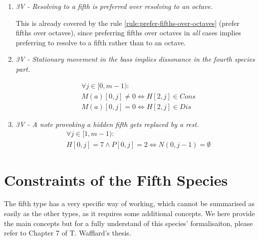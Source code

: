 \begin{enumerate}[wide, label=\bfseries 4.P\arabic*]
    \item \textit{3V - Resolving to a fifth is preferred over resolving to an octave.}    
    
    This is already covered by the rule \ref{rule:prefer-fifths-over-octaves} (prefer fifths over octaves), since preferring fifths over octaves in \textit{all} cases implies preferring to resolve to a fifth rather than to an octave.

    \item \textit{3V - Stationary movement in the bass implies dissonance in the fourth species part.}

    \begin{equation}
        \begin{aligned}
        &\forall j \in [0, m-1):\\
        &M(a)[0, j] \neq 0 \iff H[2, j] \in Cons\\
        &M(a)[0, j] = 0 \iff H[2, j] \in Dis
        \end{aligned}
    \end{equation}        


    \item \textit{3V - A note provoking a hidden fifth gets replaced by a rest.}
    \begin{equation}
        \begin{aligned}
            &\forall j \in [1, m-1):\\
            &H[0, j] = 7 \land P[0,j] = 2 \iff N(0, j-1) = \emptyset  
        \end{aligned}
    \end{equation}

\end{enumerate}
\section*{Constraints of the Fifth Species}
The fifth type has a very specific way of working, which cannot be summarised as easily as the other types, as it requires some additional concepts. We here provide the main concepts but for a fully understand of this species' formalisaiton, please refer to Chapter 7 of T. Wafflard's thesis.

